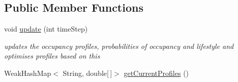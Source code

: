 \subsection*{Public Member Functions}
\begin{DoxyCompactItemize}
\item 
\hypertarget{classuk_1_1ac_1_1dmu_1_1iesd_1_1cascade_1_1controllers_1_1_proportional_wattbox_controller_a5bb1940f6acc2f3a4daca7fa04a67788}{void \hyperlink{classuk_1_1ac_1_1dmu_1_1iesd_1_1cascade_1_1controllers_1_1_proportional_wattbox_controller_a5bb1940f6acc2f3a4daca7fa04a67788}{update} (int time\-Step)}\label{classuk_1_1ac_1_1dmu_1_1iesd_1_1cascade_1_1controllers_1_1_proportional_wattbox_controller_a5bb1940f6acc2f3a4daca7fa04a67788}

\begin{DoxyCompactList}\small\item\em updates the occupancy profiles, probabilities of occupancy and lifestyle and optimises profiles based on this \end{DoxyCompactList}\item 
\hypertarget{classuk_1_1ac_1_1dmu_1_1iesd_1_1cascade_1_1controllers_1_1_proportional_wattbox_controller_ac6f5ecd36fbf4688535d712a91fa529f}{Weak\-Hash\-Map$<$ String, double\mbox{[}$\,$\mbox{]}$>$ \hyperlink{classuk_1_1ac_1_1dmu_1_1iesd_1_1cascade_1_1controllers_1_1_proportional_wattbox_controller_ac6f5ecd36fbf4688535d712a91fa529f}{get\-Current\-Profiles} ()}\label{classuk_1_1ac_1_1dmu_1_1iesd_1_1cascade_1_1controllers_1_1_proportional_wattbox_controller_ac6f5ecd36fbf4688535d712a91fa529f}


\end{DoxyCompactItemize}
